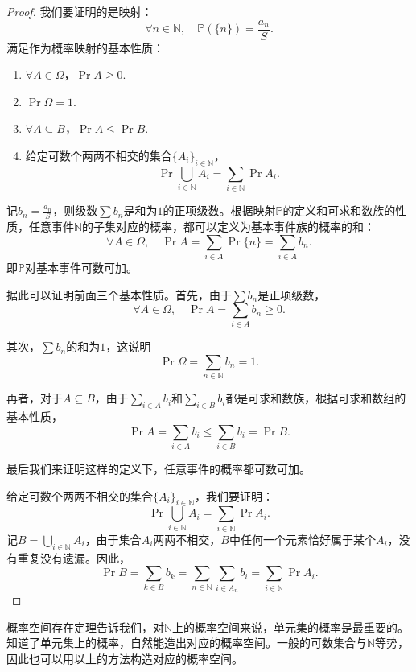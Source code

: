 \documentclass[12pt,UTF8,fontset=none]{ctexbook}
\begin{document}
\begin{proof}
    我们要证明的是映射：
    $$ \forall n\in\mathbb{N},\quad \mathbb{P}(\{n\}) = \frac{a_n}{S}.$$
    满足作为概率映射的基本性质：
    \begin{enumerate}
        \item $\forall A \in \Omega$，$\Pr{A} \geqslant 0.$
        \item $\Pr{\Omega} = 1.$
        \item $\forall A \subseteq B$，$\Pr{A} \leqslant \Pr{B}.$
        \item 给定可数个两两不相交的集合$\{A_i\}_{i\in \mathbb{N}} $，
        $$ \Pr{\bigcup_{i\in \mathbb{N}} A_i} = \sum_{i\in \mathbb{N}} \Pr{A_i}. $$
    \end{enumerate}

    记$b_n = \frac{a_n}{S}$，则级数$\sum b_n$是和为$1$的正项级数。根据映射$\mathbb{P}$的定义和可求和数族的性质，任意事件$\mathbb{N}$的子集对应的概率，都可以定义为基本事件族的概率的和：
    $$ \forall A \in \Omega, \quad \Pr{A} = \sum_{i\in A} \Pr{\{n\}} = \sum_{i\in A} b_n. $$
    即$\mathbb{P}$对基本事件可数可加。

    据此可以证明前面三个基本性质。首先，由于$\sum b_n$是正项级数，
    $$\forall A \in \Omega ,\quad \Pr{A} = \sum_{i\in A} b_n \geqslant 0.$$
    
    其次，$\sum b_n$的和为$1$，这说明
    $$\Pr{\Omega} = \sum_{n\in \mathbb{N}} b_n = 1.$$

    再者，对于$A \subseteq B$，由于$\sum_{i\in A} b_i$和$\sum_{i\in B} b_i$都是可求和数族，根据可求和数组的基本性质，
    $$\Pr{A} = \sum_{i\in A} b_i \leqslant \sum_{i\in B} b_i = \Pr{B}.$$
    
    最后我们来证明这样的定义下，任意事件的概率都可数可加。

    给定可数个两两不相交的集合$\{A_i\}_{i\in \mathbb{N}} $，我们要证明：
    $$ \Pr{\bigcup_{i\in \mathbb{N}} A_i} = \sum_{i\in \mathbb{N}} \Pr{A_i}. $$
    记$B = \bigcup_{i\in \mathbb{N}} A_i$，由于集合$A_i$两两不相交，$B$中任何一个元素恰好属于某个$A_i$，没有重复没有遗漏。因此，
    $$ \Pr{B} = \sum_{k\in B} b_k = \sum_{n\in \mathbb{N}} \sum_{i\in A_n} b_i = \sum_{i\in \mathbb{N}} \Pr{A_i}. $$

\end{proof}

概率空间存在定理告诉我们，对$\mathbb{N}$上的概率空间来说，单元集的概率是最重要的。知道了单元集上的概率，自然能造出对应的概率空间。一般的可数集合与$\mathbb{N}$等势，因此也可以用以上的方法构造对应的概率空间。
\end{document}
